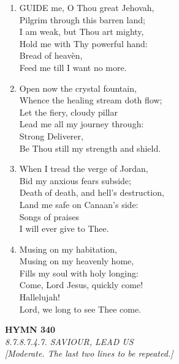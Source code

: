 \documentclass[11pt,a4paper]{article}
\begin{document}
\begin{enumerate}
    \item GUIDE me, O Thou great Jehovah, \\
        Pilgrim through this barren land; \\
        I am weak, but Thou art mighty, \\
        Hold me with Thy powerful hand: \\
        Bread of heav\`en, \\
        Feed me till I want no more.

    \item Open now the crystal fountain, \\
        Whence the healing stream doth flow; \\
        Let the fiery, cloudy pillar \\
        Lead me all my journey through: \\
        Strong Deliverer, \\
        Be Thou still my strength and shield.

    \item When I tread the verge of Jordan, \\
        Bid my anxious fears subside; \\
        Death of death, and hell's destruction, \\
        Land me safe on Canaan's side: \\
        Songs of praises \\
        I will ever give to Thee.

    \item Musing on my habitation, \\
        Musing on my heavenly home, \\
        Fills my soul with holy longing: \\
        Come, Lord Jesus, quickly come! \\
        Hallelujah! \\
        Lord, we long to see Thee come.

\end{enumerate}

\newpage
\begin{center}
    {\Large \textbf{HYMN 340}}
    \\
    \textit{8.7.8.7.4.7. SAVIOUR, LEAD US}
    \\
    \textit{\small [Moderate. The last two lines to be repeated.]}
\end{center}
\vspace{1em}
\end{document}
